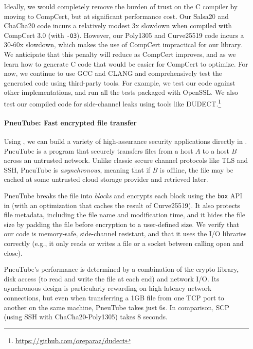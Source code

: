 \documentclass[acmsmall,review,anonymous]{acmart}\settopmatter{printfolios=true}
\begin{document}
Ideally, we would completely remove the burden of trust on the C
compiler by moving to CompCert, but at significant performance
cost. Our Salsa20 and ChaCha20 code incurs a relatively modest 3x
slowdown when compiled with CompCert 3.0 (with \texttt{-O3}). 
However, our Poly1305 and Curve25519 code incurs a 30-60x slowdown,
which makes the use of CompCert impractical for our library.
We anticipate that this penalty will reduce as CompCert
improves, and as we learn how to generate C code that would be
easier for CompCert to optimize. For now, we continue to use GCC and
CLANG and comprehensively test the generated code using third-party
tools. For example, we test our code against other implementations,
and run all the tests packaged with OpenSSL. We also 
test our compiled code for side-channel leaks using tools like 
DUDECT.\footnote{\url{https://github.com/oreparaz/dudect}}


\paragraph*{PneuTube: Fast encrypted file transfer}
Using \haclstar, we can build a variety of high-assurance security
applications directly in \lowstar.
%
PneuTube is a \lowstar program that securely transfers files from a host $A$ to a
host $B$ across an untrusted network.
%
Unlike classic secure channel protocols like TLS and SSH, PneuTube is
\emph{asynchronous}, meaning that if $B$ is offline, the file may be
cached at some untrusted cloud storage provider and retrieved later. 

PneuTube breaks the file into \emph{blocks} and encrypts each block
using the \texttt{box} API in \haclstar (with an optimization that
caches the result of Curve25519).
%
It also protects file metadata, including the file name and
modification time, and it hides the file size by padding the file
before encryption to a user-defined size.
%
We verify that our code is memory-safe, side-channel resistant, and that
it uses the I/O libraries correctly (e.g., it only reads or writes
a file or a socket between calling open and close).

PneuTube's performance is determined by a combination of the crypto
library, disk access (to read and write the file at each end) and  network I/O. 
%
Its aynchronous design is particularly rewarding on high-latency
network connections, but even when transferring a 1GB file from one
TCP port to another on the same machine, PneuTube takes just 6s.
%
In comparison, SCP (using SSH with ChaCha20-Poly1305) takes 8 seconds. 
\end{document}
